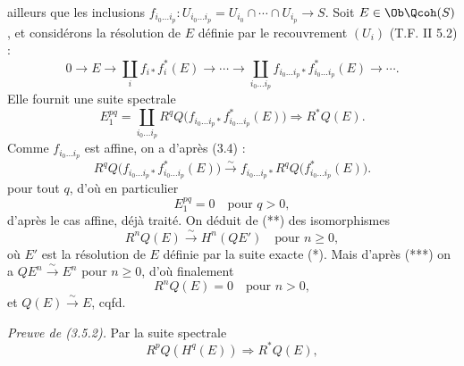 ailleurs que les inclusions $f_{i_0\ldots i_p}:U_{i_0\ldots i_p}=U_{i_0}\cap\cdots\cap U_{i_p}\longrightarrow S$. Soit $E\in\Ob\Qcoh(S)$, et considérons la résolution de $E$ définie par le recouvrement $(U_i)$ (T.F. II 5.2) :
\begin{equation}\tag{*}
 0\longrightarrow E\longrightarrow \coprod_i f_{i*}f_i^*(E)\longrightarrow\cdots\longrightarrow
 \coprod_{i_0\ldots i_p}f_{i_0\ldots i_p*}f_{i_0\ldots i_p}^*(E)\longrightarrow\cdots .
\end{equation}
Elle fournit une suite spectrale
\begin{equation}\tag{**}
 E_1^{pq}=\coprod_{i_0\ldots i_p}R^qQ\bigl(f_{i_0\ldots i_p*}f_{i_0\ldots i_p}^*(E)\bigr)
 \Longrightarrow R^{*}Q(E).
\end{equation}
Comme $f_{i_0\ldots i_p}$ est affine, on a d'après (3.4) :
\begin{equation}\tag{***}
 R^qQ\bigl(f_{i_0\ldots i_p*}f_{i_0\ldots i_p}^*(E)\bigr)
 \xrightarrow{\sim} f_{i_0\ldots i_p*}R^qQ\bigl(f_{i_0\ldots i_p}^*(E)\bigr).
\end{equation}
pour tout $q$, d'où en particulier
\[
 E_1^{pq}=0\quad\text{pour }q>0,
\]
d'après le cas affine, déjà traité. On déduit de (**) des isomorphismes
\[
 R^nQ(E)\xrightarrow{\sim} H^n(QE')\quad\text{pour }n\geq0,
\]
où $E'$ est la résolution de $E$ définie par la suite exacte (*). Mais d'après (***) on a $QE^n\xrightarrow{\sim} E^n$ pour $n\geq0$, d'où finalement
\[
 R^nQ(E)=0\quad\text{pour }n>0,
\]
et $Q(E)\xrightarrow{\sim} E$, cqfd.

\emph{Preuve de (3.5.2).} Par la suite spectrale
\[
 R^pQ(H^q(E))\Longrightarrow R^{*}Q(E),
\]
